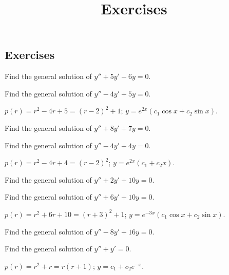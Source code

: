 \documentclass{ximera}
\title{Exercises} \license{CC BY-NC-SA 4.0}
\begin{document}
\begin{abstract}
\end{abstract}
\maketitle

\begin{onlineOnly}
\section*{Exercises}
\end{onlineOnly}


\begin{problem}\label{exer:5.2.1} Find the general solution of $y''+5y'-6y=0$.
\end{problem}

\begin{problem}\label{exer:5.2.2} Find the general solution of $y''-4y'+5y=0$.
\begin{solution}
$p(r)=r^2-4r+5=(r-2)^2+1$;\;
$y=e^{2x}(c_1 \cos x+c_2 \sin x)$.
\end{solution}
\end{problem}
 \begin{problem}\label{exer:5.2.3} Find the general solution of $y''+8y'+7y=0$.
\end{problem} 

\begin{problem}\label{exer:5.2.4} Find the general solution of $y''-4y'+4y=0$.
\begin{solution}
$p(r)=r^2-4r+4=(r-2)^2$;\;
 $y=e^{2x}(c_1+c_2x)$.
\end{solution}
\end{problem} 
 \begin{problem}\label{exer:5.2.5}  Find the general solution of $y''+2y'+10y=0$.
\end{problem} 

\begin{problem}\label{exer:5.2.6}  Find the general solution of $y''+6y'+10y=0$.
\begin{solution}
$p(r)=r^2+6r+10=(r+3)^2+1$;\;
$y=e^{-3x}(c_1 \cos x+c_2 \sin x)$.
\end{solution}
\end{problem} 
 \begin{problem}\label{exer:5.2.7} Find the general solution of $y''-8y'+16y=0$.
\end{problem} 

\begin{problem}\label{exer:5.2.8}  Find the general solution of $y''+y'=0$.
\begin{solution}
$p(r)=r^2+r=r(r+1)$;\;
 $y=c_1+c_2e^{-x}$.
\end{solution}
\end{problem} 
\end{document}
